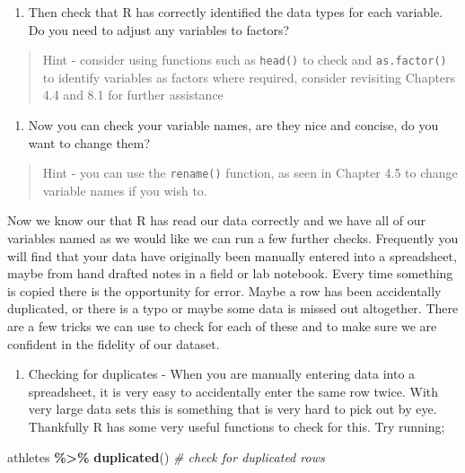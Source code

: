 \documentclass[
]{book}
\newenvironment{Shaded}{\begin{snugshade}}{\end{snugshade}}
\newcommand{\CommentTok}[1]{\textcolor[rgb]{0.56,0.35,0.01}{\textit{#1}}}
\newcommand{\FunctionTok}[1]{\textcolor[rgb]{0.13,0.29,0.53}{\textbf{#1}}}
\newcommand{\NormalTok}[1]{#1}
\newcommand{\SpecialCharTok}[1]{\textcolor[rgb]{0.81,0.36,0.00}{\textbf{#1}}}
\providecommand{\tightlist}{%
  \setlength{\itemsep}{0pt}\setlength{\parskip}{0pt}}
\begin{document}
\begin{enumerate}
\def\labelenumi{\arabic{enumi})}
\setcounter{enumi}{1}
\tightlist
\item
  Then check that R has correctly identified the data types for each variable. Do you need to adjust any variables to factors?
\end{enumerate}

\begin{quote}
Hint - consider using functions such as \texttt{head()} to check and \texttt{as.factor()} to identify variables as factors where required, consider revisiting Chapters 4.4 and 8.1 for further assistance
\end{quote}

\begin{enumerate}
\def\labelenumi{\arabic{enumi})}
\setcounter{enumi}{2}
\tightlist
\item
  Now you can check your variable names, are they nice and concise, do you want to change them?
\end{enumerate}

\begin{quote}
Hint - you can use the \texttt{rename()} function, as seen in Chapter 4.5 to change variable names if you wish to.
\end{quote}

Now we know our that R has read our data correctly and we have all of our variables named as we would like we can run a few further checks. Frequently you will find that your data have originally been manually entered into a spreadsheet, maybe from hand drafted notes in a field or lab notebook. Every time something is copied there is the opportunity for error. Maybe a row has been accidentally duplicated, or there is a typo or maybe some data is missed out altogether. There are a few tricks we can use to check for each of these and to make sure we are confident in the fidelity of our dataset.

\begin{enumerate}
\def\labelenumi{\arabic{enumi})}
\tightlist
\item
  Checking for duplicates - When you are manually entering data into a spreadsheet, it is very easy to accidentally enter the same row twice. With very large data sets this is something that is very hard to pick out by eye. Thankfully R has some very useful functions to check for this. Try running;
\end{enumerate}

\begin{Shaded}
\begin{Highlighting}[]
\NormalTok{athletes }\SpecialCharTok{\%\textgreater{}\%}
  \FunctionTok{duplicated}\NormalTok{() }\CommentTok{\# check for duplicated rows}
\end{Highlighting}
\end{Shaded}
\end{document}

